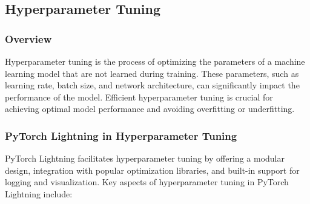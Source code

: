 \documentclass[12pt]{article}
\begin{document}
\subsection{Hyperparameter Tuning}

\subsubsection{Overview}

Hyperparameter tuning is the process of optimizing the parameters of a machine learning model that are not learned during training. These parameters, such as learning rate, batch size, and network architecture, can significantly impact the performance of the model. Efficient hyperparameter tuning is crucial for achieving optimal model performance and avoiding overfitting or underfitting.

\subsubsection{PyTorch Lightning in Hyperparameter Tuning}

PyTorch Lightning facilitates hyperparameter tuning by offering a modular design, integration with popular optimization libraries, and built-in support for logging and visualization. Key aspects of hyperparameter tuning in PyTorch Lightning include:
\end{document}
